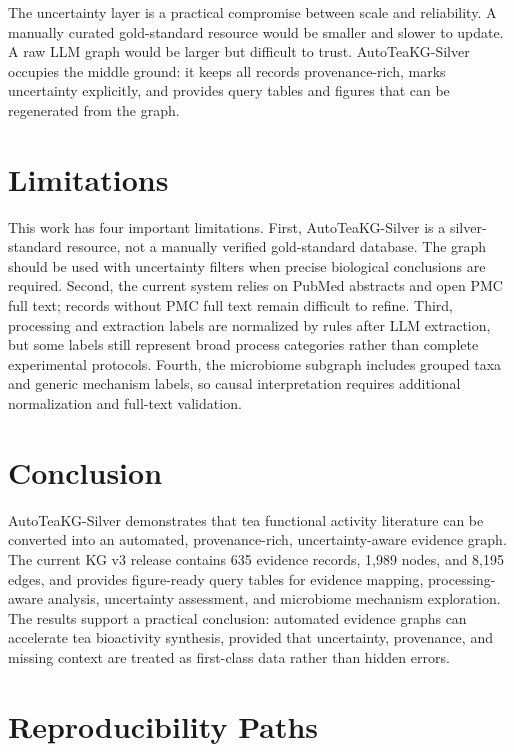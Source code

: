 \documentclass[11pt]{article}
\begin{document}
The uncertainty layer is a practical compromise between scale and reliability. A manually curated gold-standard resource would be smaller and slower to update. A raw LLM graph would be larger but difficult to trust. AutoTeaKG-Silver occupies the middle ground: it keeps all records provenance-rich, marks uncertainty explicitly, and provides query tables and figures that can be regenerated from the graph.

\section{Limitations}

This work has four important limitations. First, AutoTeaKG-Silver is a silver-standard resource, not a manually verified gold-standard database. The graph should be used with uncertainty filters when precise biological conclusions are required. Second, the current system relies on PubMed abstracts and open PMC full text; records without PMC full text remain difficult to refine. Third, processing and extraction labels are normalized by rules after LLM extraction, but some labels still represent broad process categories rather than complete experimental protocols. Fourth, the microbiome subgraph includes grouped taxa and generic mechanism labels, so causal interpretation requires additional normalization and full-text validation.

\section{Conclusion}

AutoTeaKG-Silver demonstrates that tea functional activity literature can be converted into an automated, provenance-rich, uncertainty-aware evidence graph. The current KG v3 release contains 635 evidence records, 1,989 nodes, and 8,195 edges, and provides figure-ready query tables for evidence mapping, processing-aware analysis, uncertainty assessment, and microbiome mechanism exploration. The results support a practical conclusion: automated evidence graphs can accelerate tea bioactivity synthesis, provided that uncertainty, provenance, and missing context are treated as first-class data rather than hidden errors.

\appendix

\section{Reproducibility Paths}
\label{app:reproducibility}
\end{document}
